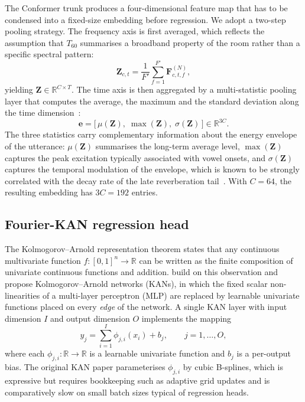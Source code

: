 \documentclass[a4paper,fleqn]{cas-dc}
\begin{document}
The Conformer trunk produces a four-dimensional feature map that has to
be condensed into a fixed-size embedding before regression. We adopt a
two-step pooling strategy. The frequency axis is first averaged, which
reflects the assumption that $T_{60}$ summarises a broadband property of
the room rather than a specific spectral pattern:
\begin{equation}\label{eq:freq_avg}
  \mathbf{Z}_{c,t} = \frac{1}{F'}\sum_{f=1}^{F'}\mathbf{F}^{(N)}_{c,t,f},
\end{equation}
yielding $\mathbf{Z}\in\mathbb{R}^{C\times T}$. The time axis is then
aggregated by a multi-statistic pooling layer that computes the average,
the maximum and the standard deviation along the time
dimension~\citep{snyder2018xvector}:
\begin{equation}\label{eq:multipool}
  \mathbf{e} = \bigl[\,\mu(\mathbf{Z}),\;
   \max(\mathbf{Z}),\;\sigma(\mathbf{Z})\,\bigr] \in \mathbb{R}^{3C}.
\end{equation}
The three statistics carry complementary information about the energy
envelope of the utterance: $\mu(\mathbf{Z})$ summarises the long-term
average level, $\max(\mathbf{Z})$ captures the peak excitation typically
associated with vowel onsets, and $\sigma(\mathbf{Z})$ captures the
temporal modulation of the envelope, which is known to be strongly
correlated with the decay rate of the late reverberation
tail~\citep{falk2010temporal}. With $C=64$, the resulting embedding has
$3C=192$ entries.

\subsection{Fourier-KAN regression head}\label{sec:method:head}

The Kolmogorov--Arnold representation theorem states that any
continuous multivariate function $f:[0,1]^{n}\to\mathbb{R}$ can be
written as the finite composition of univariate continuous functions
and addition. \citet{liu2024kan} build on this observation and propose
Kolmogorov--Arnold networks (KANs), in which the fixed scalar
non-linearities of a multi-layer perceptron (MLP) are replaced by
learnable univariate functions placed on every \emph{edge} of the
network. A single KAN layer with input dimension $I$ and output
dimension $O$ implements the mapping
\begin{equation}\label{eq:kan_layer}
  y_j = \sum_{i=1}^{I} \phi_{j,i}(x_i) + b_j,
  \qquad j=1,\ldots,O,
\end{equation}
where each $\phi_{j,i}:\mathbb{R}\to\mathbb{R}$ is a learnable univariate
function and $b_j$ is a per-output bias. The original KAN paper
parameterises $\phi_{j,i}$ by cubic B-splines, which is expressive but
requires bookkeeping such as adaptive grid updates and is comparatively
slow on small batch sizes typical of regression heads.
\end{document}
